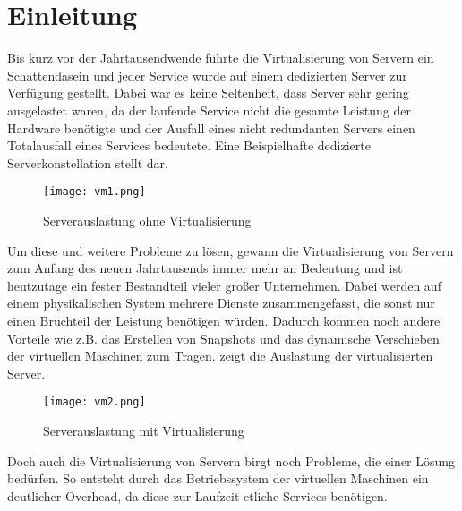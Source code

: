 \section{Einleitung}
\label{sec:Einleitung}
Bis kurz vor der Jahrtausendwende führte die Virtualisierung von Servern ein Schattendasein und jeder Service wurde auf einem dedizierten Server zur Verfügung gestellt.
Dabei war es keine Seltenheit, dass Server sehr gering ausgelastet waren, da der laufende Service nicht die gesamte Leistung der Hardware benötigte und der Ausfall eines nicht redundanten Servers einen Totalausfall eines Services bedeutete.
Eine Beispielhafte dedizierte Serverkonstellation stellt  dar.
\begin{figure}[H]
	\vspace{-20pt}
	\begin{center}
		\texttt{[image: vm1.png]}
	\end{center}
	\caption[Serverauslastung ohne Virtualisierung]{Serverauslastung ohne Virtualisierung \footnotemark}
	\vspace{-20pt}
	\label{fig:HW1}
\end{figure}
Um diese und weitere Probleme zu lösen, gewann die Virtualisierung von Servern zum Anfang des neuen Jahrtausends immer mehr an Bedeutung und ist heutzutage ein fester Bestandteil vieler großer Unternehmen.
Dabei werden auf einem physikalischen System mehrere Dienste zusammengefasst, die sonst nur einen Bruchteil der Leistung benötigen würden.
Dadurch kommen noch andere Vorteile wie z.B. das Erstellen von Snapshots und das dynamische Verschieben der virtuellen Maschinen zum Tragen.
 zeigt die Auslastung der virtualisierten Server.
\begin{figure}[H]
	\begin{center}
		\texttt{[image: vm2.png]}
	\end{center}
	\caption[Serverauslastung mit Virtualisierung]{Serverauslastung mit Virtualisierung \footnotemark}
	\label{fig:HW2}
	\vspace{-30pt}
\end{figure}
Doch auch die Virtualisierung von Servern birgt noch Probleme, die einer Lösung bedürfen.
So entsteht durch das Betriebssystem der virtuellen Maschinen ein deutlicher Overhead, da diese zur Laufzeit etliche Services benötigen.
